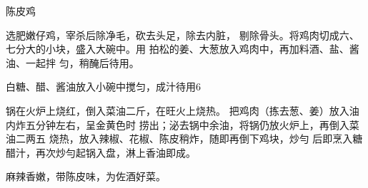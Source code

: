 \begin{recipe}{陈皮鸡}

\ingredients


\cooking

\step 选肥嫩仔鸡，宰杀后除净毛，砍去头足，除去内脏， 剔除骨头。将鸡肉切成六、七分大的小块，盛入大碗中。用 拍松的姜、大葱放入鸡肉中，再加料酒、盐、酱油、一起拌 匀，稍醃后待用。

\step 白糖、醋、酱油放入小碗中搅匀，成汁待用6

\step 锅在火炉上烧红，倒入菜油二斤，在旺火上烧热。 把鸡肉（拣去葱、姜）放入油内炸五分钟左右，呈金黄色时 捞出；泌去锅中余油，将锅仍放火炉上，再倒入菜油二两五 烧热，放入辣椒、花椒、陈皮稍炸，随即再倒下鸡块，炒勻 后即烹入糖醋汁，再次炒勻起锅入盘，淋上香油即成。

\notes

麻辣香嫩，带陈皮味，为佐酒好菜。

\end{recipe}

